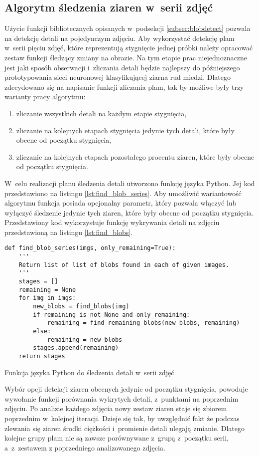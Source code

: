 \subsection{Algorytm śledzenia ziaren w~serii zdjęć}
\label{subsec:blobtracking}
Użycie funkcji bibliotecznych opisanych w~podsekcji \ref{subsec:blobdetect}
pozwala na detekcję detali na pojedynczym zdjęciu.
Aby wykorzystać detekcję plam w~serii pięciu zdjęć, które reprezentują
stygnięcie jednej próbki należy opracować zestaw funkcji śledzący zmiany 
na obrazie.
Na tym etapie prac niejednoznaczne jest jaki sposób obserwacji i~zliczania
detali będzie najlepszy do późniejszego prototypowania sieci neuronowej
klasyfikującej ziarna rud miedzi.
Dlatego zdecydowano się na napisanie funkcji zliczania plam, tak by
możliwe były trzy warianty pracy algorytmu:
\begin{enumerate}[1.]
	\item \label{it:allblob}
	      zliczanie wszystkich detali na każdym etapie stygnięcia,
	\item \label{it:remainingblob}
	      zliczanie na kolejnych etapach stygnięcia jedynie tych detali,
	      które były obecne od początku stygnięcia,
	\item \label{it:percentblob}
	      zliczanie na kolejnych etapach pozostałego procentu ziaren, które
	      były obecne od początku stygnięcia.
\end{enumerate}

W~celu realizacji planu śledzenia detali utworzono funkcję języka Python.
Jej kod przedstawiono na listingu \ref{lst:find_blob_series}.
Aby umożliwić wariantowość algorytmu funkcja posiada opcjonalny parametr,
który pozwala włączyć lub wyłączyć śledzenie jedynie tych ziaren, które
były obecne od początku stygnięcia.
Przedstawiony kod wykorzystuje funkcję wykrywania detali na zdjęciu
przedstawioną na listingu \ref{lst:find_blobs}.
\begin{listing}[htbp]
\begin{verbatim}
def find_blob_series(imgs, only_remaining=True):
    '''
    Return list of list of blobs found in each of given images.
    '''
    stages = []
    remaining = None
    for img in imgs:
        new_blobs = find_blobs(img)
        if remaining is not None and only_remaining:
            remaining = find_remaining_blobs(new_blobs, remaining)
        else:
            remaining = new_blobs
        stages.append(remaining)
    return stages
\end{verbatim}
\caption{Funkcja języka Python do śledzenia detali w~serii zdjęć}
\label{lst:find_blob_series}
\end{listing}
Wybór opcji detekcji ziaren obecnych jedynie od początku stygnięcia,
powoduje wywołanie funkcji porównania wykrytych detali, z~punktami
na poprzednim zdjęciu.
Po analizie każdego zdjęcia nowy zestaw ziaren staje się zbiorem poprzednim
w~kolejnej iteracji.
Dzieje się tak, by uwzględnić fakt że podczas zlewania się ziaren środki
ciężkości i~promienie detali ulegają zmianie.
Dlatego kolejne grupy plam nie są zawsze porównywane z~grupą z~początku
serii, a~z~zestawem z poprzedniego analizowanego zdjęcia.

